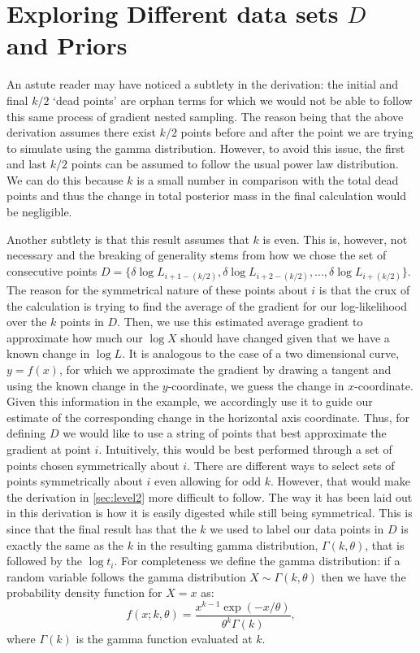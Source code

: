 \section{Exploring Different data sets $D$ and Priors}\label{sec:exploring}
An astute reader may have noticed a subtlety in the derivation: the initial and final $k/2$ `dead points' are orphan terms for which we would not be able to follow this same process of gradient nested sampling. The reason being that the above derivation assumes there exist $k/2$ points before and after the point we are trying to simulate using the gamma distribution. However, to avoid this issue, the first and last $k/2$ points can be assumed to follow the usual power law distribution. We can do this because $k$ is a small number in comparison with the total dead points and thus the change in total posterior mass in the final calculation would be negligible. 

Another subtlety is that this result assumes that $k$ is even. This is, however, not necessary and the breaking of generality stems from how we chose the set of consecutive points $D= \{ \delta \log L_{i+1-(k/2)},\delta \log L_{i+2-(k/2)},...,\delta \log L_{i+(k/2)} \}$. The reason for the symmetrical nature of these points about $i$ is that the crux of the calculation is trying to find the average of the gradient for our log-likelihood over the $k$ points in $D$. Then, we use this estimated average gradient to approximate how much our $\log X$ should have changed given that we have a known change in $\log L$. It is analogous to the case of a two dimensional curve, $y=f(x)$, for which we approximate the gradient by drawing a tangent and using the known change in the $y$-coordinate, we guess the change in $x$-coordinate. Given this information in the example, we accordingly use it to guide our estimate of the corresponding change in the horizontal axis coordinate. Thus, for defining $D$ we would like to use a string of points that best approximate the gradient at point $i$. Intuitively, this would be best performed through a set of points chosen symmetrically about $i$. There are different ways to select sets of points symmetrically about $i$ even allowing for odd $k$. However, that would make the derivation in \cref{sec:level2} more difficult to follow. The way it has been laid out in this derivation is how it is easily digested while still being symmetrical. This is since that the final result has that the $k$ we used to label our data points in $D$ is exactly the same as the $k$ in the resulting gamma distribution, $\Gamma (k,\theta)$, that is followed by the $\log t_i$. For completeness we define the gamma distribution: if a random variable follows the gamma distribution $X \sim \Gamma (k,\theta)$ then we have the probability density function for $X= x$ as:
%
\begin{equation}
    f(x;k,\theta) = \frac{x^{k-1} \exp (-x/\theta)}{\theta^k \Gamma(k)}, 
\end{equation}
%
where $\Gamma(k)$ is the gamma function evaluated at $k$.

